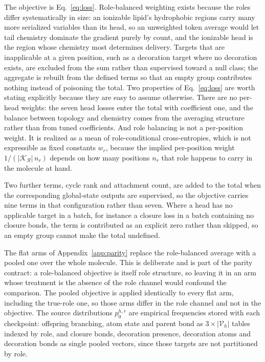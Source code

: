 \documentclass{article}
\makeatletter
\def\paragraph{\@startsection{paragraph}{4}{\z@}{0.6ex plus 0.2ex minus .1ex}{-1em}{\normalsize\bf}}
\makeatother
\begin{document}
The objective is Eq.~\eqref{eq:loss}. Role-balanced weighting exists because the roles differ
systematically in size: an ionizable lipid's hydrophobic regions carry many more serialized variables
than its head, so an unweighted token average would let tail chemistry dominate the gradient purely
by count, and the ionizable head is the region whose chemistry most determines delivery. Targets that
are inapplicable at a given position, such as a decoration target where no decoration exists, are
excluded from the sum rather than supervised toward a null class; the aggregate is rebuilt from the
defined terms so that an empty group contributes nothing instead of poisoning the total.
Two properties of Eq.~\eqref{eq:loss} are worth stating explicitly because they are easy to assume
otherwise. There are no per-head weights: the seven head losses enter the total with coefficient one,
and the balance between topology and chemistry comes from the averaging structure rather than from
tuned coefficients. And role balancing is not a per-position weight. It is realized as a mean of
role-conditional cross-entropies, which is not expressible as fixed constants $w_r$, because the
implied per-position weight $1/(|\mathcal{K}_{\mathcal{R}}|\,n_r)$ depends on how many positions
$n_r$ that role happens to carry in the molecule at hand.

Two further terms, cycle rank and attachment count, are added to the total when the corresponding
global-state outputs are supervised, so the objective carries nine terms in that configuration rather
than seven. Where a head has no applicable target in a batch, for instance a closure loss in a batch
containing no closure bonds, the term is contributed as an explicit zero rather than skipped, so an
empty group cannot make the total undefined.

The flat arms of Appendix~\ref{app:parity} replace the role-balanced average with a pooled one over
the whole molecule. This is deliberate and is part of the parity contract: a role-balanced objective
is itself role structure, so leaving it in an arm whose treatment is the absence of the role channel
would confound the comparison. The pooled objective is applied identically to every flat arm,
including the true-role one, so those arms differ in the role channel and not in the objective.
\paragraph{Role-specific source marginals.}
The source distributions $p_0^{h,r}$ are empirical frequencies stored with each checkpoint: offspring
branching, atom state and parent bond as $3 \times |\mathcal{V}_h|$ tables indexed by role, and
closure bonds, decoration presence, decoration atoms and decoration bonds as single pooled vectors,
since those targets are not partitioned by role.
\end{document}
